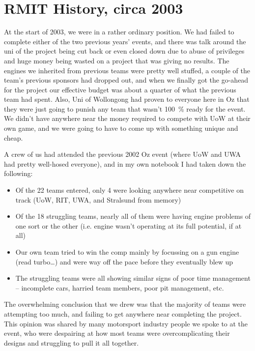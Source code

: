 \documentclass[10pt, a4paper, article, oneside, twocolumn, final]{memoir}
\begin{document}
\section*{RMIT History, circa 2003}

At the start of 2003, we were in a rather ordinary position. We had failed to complete either of the two previous years’ events, and there was talk around the uni of the project being cut back or even closed down due to abuse of privileges and huge money being wasted on a project that was giving no results. The engines we inherited from previous teams were pretty well stuffed, a couple of the team’s previous sponsors had dropped out, and when we finally got the go-ahead for the project our effective budget was about a quarter of what the previous team had spent. Also, Uni of Wollongong had proven to everyone here in Oz that they were just going to punish any team that wasn’t \SI{100}{\percent} ready for the event. We didn’t have anywhere near the money required to compete with UoW at their own game, and we were going to have to come up with something unique and cheap. 

A crew of us had attended the previous 2002 Oz event (where UoW and UWA had pretty well-hosed everyone), and in my own notebook I had taken down the following: 

\begin{itemize}
    \item Of the \num{22} teams entered, only \num{4} were looking anywhere near competitive on track (UoW, RIT, UWA, and Stralsund from memory) 
    \item Of the \num{18} struggling teams, nearly all of them were having engine problems of one sort or the other (i.e. engine wasn’t operating at its full potential, if at all) 
    \item Our own team tried to win the comp mainly by focussing on a gun engine (read turbo\ldots) and were way off the pace before they eventually blew up 
    \item The struggling teams were all showing similar signs of poor time management -- incomplete cars, harried team members, poor pit management, etc. 
\end{itemize}

The overwhelming conclusion that we drew was that the majority of teams were attempting too much, and failing to get anywhere near completing the project. This opinion was shared by many motorsport industry people we spoke to at the event, who were despairing at how most teams were overcomplicating their designs and struggling to pull it all together. 
\end{document}
